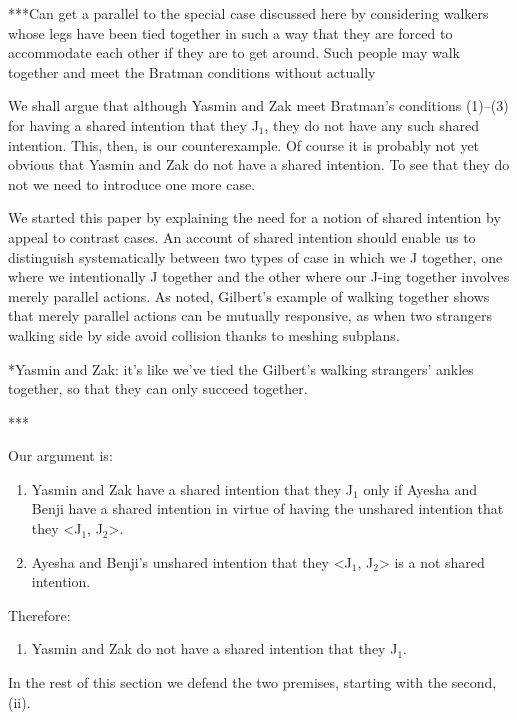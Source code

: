 \documentclass[12pt,\papersize]{extarticle}
\begin{document}
%


 

***Can get a parallel to the special case discussed here by considering walkers whose legs have been tied together in such a way that they are forced to accommodate each other if they are to get around.  Such people may walk together and meet the Bratman conditions without actually 




We shall argue that although Yasmin and Zak meet Bratman's conditions (1)--(3) for having a shared intention that they J$_1$, they do not have any such shared intention.
This, then, is our counterexample.
Of course it is probably not yet obvious that Yasmin and Zak do not have a shared intention.
To see that they do not we need to introduce one more case.

We started this paper by explaining the need for a notion of shared intention by appeal to contrast cases. 
An account of shared intention should enable us to  distinguish systematically between two types of case in which we J together, one where we intentionally J together and the other where  our J-ing together involves  merely parallel actions.
As noted, Gilbert's example of walking together shows that merely parallel actions can be mutually responsive, as when two strangers walking side by side avoid collision thanks to meshing subplans.



*Yasmin and Zak: it's like we've tied the Gilbert's walking strangers' ankles together, so that they can only succeed together.





***


Our argument is:
\begin{enumerate}[label=\roman*]
\item Yasmin and Zak have a shared intention that they J$_1$ only if Ayesha and Benji have a shared intention in virtue of having the 
 unshared intention that they <J$_1$, J$_2$>.
\item Ayesha and Benji's unshared intention that they <J$_1$, J$_2$> is a not shared intention.
\end{enumerate}
%
Therefore:
%
\begin{enumerate}[resume,label=\roman*]
\item Yasmin and Zak do not have a shared intention that they J$_1$.
\end{enumerate}
%
In the rest of this section we defend the two premises, starting with the second, (ii).
\end{document}
